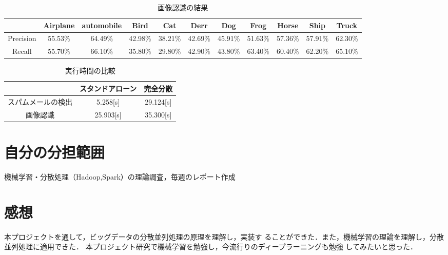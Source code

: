 \documentclass[a4paper,12pt]{jarticle}
\begin{document}
%
%
\begin{table}[h]
\centering
\caption{画像認識の結果}
 \label{tab:image_result}
\fontsize{8pt}{9pt}\selectfont
 \begin{tabular}{c|c|c|c|c|c|c|c|c|c|c} \hline
  &Airplane&automobile&Bird&Cat&Derr&Dog&Frog&Horse&Ship&Truck \\ \hline
Precision&55.53\% & 64.49\% & 42.98\% & 38.21\%& 42.69\% & 45.91\% & 51.63\% & 57.36\% & 57.91\% & 62.30\% \\ \hline
 Recall&55.70\% & 66.10\% & 35.80\% & 29.80\% &42.90\% & 43.80\% &63.40\% & 60.40\% & 62.20\% & 65.10\%  \\ \hline
\end{tabular}
\end{table}
%
\begin{table}[h]
\centering
\caption{実行時間の比較}
\label{tab:mail_time}
\fontsize{9pt}{10pt}\selectfont
\begin{tabular}{c||c|c} \hline
&スタンドアローン&完全分散 \\\hline \hline 
スパムメールの検出& 5.258[s]& 29.124[s]  \\ \hline
画像認識&25.903[s]& 35.300[s]   \\ \hline
\end{tabular}
\end{table}
%
\section{自分の分担範囲}
機械学習・分散処理（Hadoop,Spark）の理論調査，毎週のレポート作成
\section{感想}
本プロジェクトを通して，ビッグデータの分散並列処理の原理を理解し，実装す
ることができた．また，機械学習の理論を理解し，分散並列処理に適用できた．
本プロジェクト研究で機械学習を勉強し，今流行りのディープラーニングも勉強
してみたいと思った．
\newpage
\end{document}
